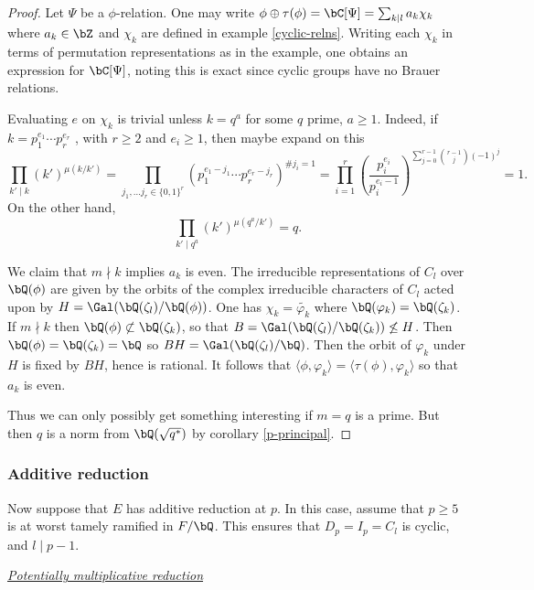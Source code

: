 \begin{proof}
    Let $\Psi$ be a $\phi$-relation. One may write $\phi \oplus \tau(\phi) = \bC[\Psi] = \sum_{k \mid l}{a_k} \chi_k$ where $a_k \in \bZ$ and $\chi_k$ are defined in example \ref{cyclic-relns}. Writing each $\chi_k$ in terms of permutation representations as in the example, one obtains an expression for $\bC[\Psi]$, noting this is exact since cyclic groups have no Brauer relations.

    Evaluating $e$ on $\chi_k$ is trivial unless $k = q^a$ for some $q$ prime, $a \geq 1$. Indeed, if $k = p_1^{e_1} \cdots p_r^{e_r}$ , with $r \geq 2$ and $e_i \geq 1$, then {\color{red} maybe expand on this}
    \[ \prod_{k' \mid k} (k')^{\mu(k / k')} = \prod_{j_1, \ldots j_r \in \{0,1\}^r } \left(p_1^{e_1 - j_1} \cdots p_r^{e_r - j_r}\right)^{\# j_i = 1} = \prod_{i = 1}^r \left(\frac{p_i^{e_i}}{p_i^{e_i - 1}}\right)^{\sum_{ j = 0}^{r - 1} \binom{r-1}{j} (-1)^j} = 1. \]
    On the other hand,
    \[ \prod_{k' \mid q^a} (k')^{\mu(q^a / k')} = q .\]
    
    We claim that $m \nmid k$ implies $a_k$ is even. The irreducible representations of $C_l$ over $\bQ(\phi)$ are given by the orbits of the complex irreducible characters of $C_l$ acted upon by $H = \Gal (\bQ(\zeta_l) / \bQ(\phi))$. One has $\chi_k = \widetilde{\varphi_k}$ where $\bQ(\varphi_k) = \bQ(\zeta_k)$. If $ m \nmid k$ then $\bQ(\phi) \not\subset \bQ(\zeta_k)$, so that $B = \Gal(\bQ(\zeta_l) / \bQ(\zeta_k)) \not\leq H$. Then $\bQ(\phi) = \bQ(\zeta_k) = \bQ$ so $BH = \Gal(\bQ(\zeta_l) / \bQ)$. Then the orbit of $\varphi_k$ under $H$ is fixed by $BH$, hence is rational. It follows that $\langle \phi, \varphi_k \rangle = \langle \tau(\phi) , \varphi_k \rangle$ so that $a_k$ is even.  

    Thus we can only possibly get something interesting if $m = q$ is a prime. But then $q$ is a norm from $\bQ(\sqrt{q^*})$ by corollary \ref{p-principal}. 
\end{proof}

\subsubsection{Additive reduction}

Now suppose that $E$ has additive reduction at $p$. In this case, assume that $p \geq 5$ is at worst tamely ramified in $F / \bQ$. This ensures that $D_p = I_p = C_l$ is cyclic, and $l \mid p - 1$. 

\noindent\underline{\textit{Potentially multiplicative reduction}}

